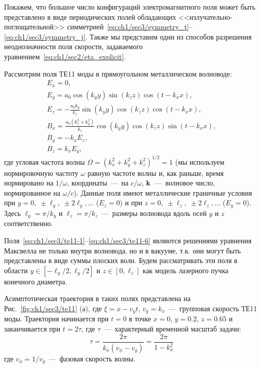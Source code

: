 Покажем, что большое число конфигураций электромагнитного поля может быть представлено в виде периодических полей обладающих <<излучательно-поглощательной>> симметрией~\eqref{eq:ch1/sec3/symmetry_t}--\eqref{eq:ch1/sec3/symmetry_j}. Также мы представим один из способов разрешения неоднозначности поля скорости, задаваемого уравнением~\eqref{eq:ch1/sec2/eta_explicit}.

Рассмотрим поля ТЕ11 моды в прямоугольном металлическом волноводе:
\begin{eqnarray}
    \label{eq:ch1/sec3/te11-1}
    E_x = 0, \\
    \label{eq:ch1/sec3/te11-2}
    E_y = a_0 \cos(k_y y) \sin(k_z z) \cos(t - k_x x), \\
    \label{eq:ch1/sec3/te11-3}
    E_z = -\frac{a_0 k_y}{k_z} \sin(k_y y) \cos(k_z z) \cos(t - k_x x), \\
    \label{eq:ch1/sec3/te11-4}
    B_x = \frac{a_0 (k_z^2 + k_y^2)}{k_z} \cos(k_y y) \cos(k_z z) \sin(t - k_x x), \\
    \label{eq:ch1/sec3/te11-5}
    B_y = -k_x E_z, \\
    \label{eq:ch1/sec3/te11-6}
    B_z = k_x E_y,
\end{eqnarray}
где угловая частота волны $\Omega = (k_x^2 + k_y^2 + k_z^2)^{1/2}= 1$ (мы используем нормировочную частоту $\omega$ равную частоте волны и, как раньше, время нормировано на $1/\omega$, координаты~---~на $c / \omega$, $\vb k$~---~волновое число, нормированное на $\omega / c$).
Данные поля имеют металлические граничные условия при $y = 0, \; \pm \ell_y, \; \pm 2 \ell_y,...$
($E_z = 0$) и при $z = 0, \; \pm \ell_z, \; \pm 2 \ell_z,...$ ($E_y = 0$). Здесь $\ell_y = \pi /
k_y$ и $\ell_z = \pi / k_z$~---~размеры волновода вдоль осей $y$ и $z$ соответственно.

Поля~\eqref{eq:ch1/sec3/te11-1}--\eqref{eq:ch1/sec3/te11-6} являются решениями уравнения Максвелла не только внутри волновода, но и в вакууме, т.к. они могут быть представлены в виде суммы плоских волн. Будем рассматривать эти поля в области $y \in [-\ell_y / 2, \ell_y /2]$ и $z \in [0, \ell_z]$ как модель лазерного пучка конечного диаметра.

Асимптотическая траектория в таких полях представлена на Рис.~\ref{fig:ch1/sec3/te11} (а), где $\xi = x - v_g t$, $v_g=k_x$~---~групповая скорость ТЕ11 моды. Траектория начинается при $t = 0$ в точке $x = 0$, $y = 0.2$, $z = 0.65$ и заканчивается при $t = 2 \tau$, где $\tau$~---~характерный временной масштаб задачи:
\begin{equation}
    \label{tau}
    \tau = \frac{2 \pi}{k_x (v_\phi - v_g)} = \frac{2 \pi}{1 - k_x^2}
\end{equation}
где $v_\phi = 1 / v_g$~---~фазовая скорость волны. 

